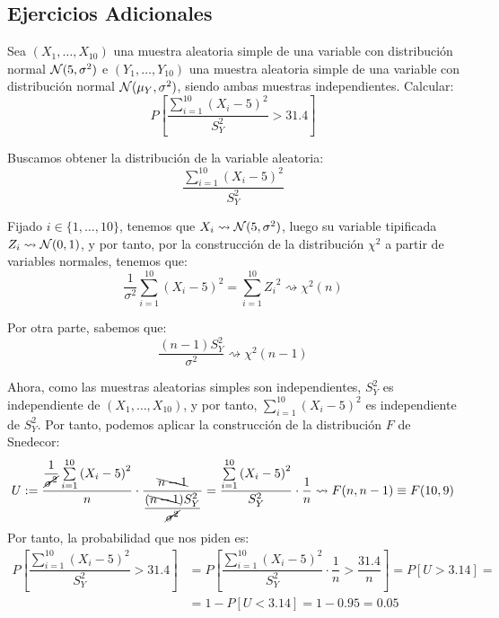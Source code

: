 \subsection*{Ejercicios Adicionales}
\begin{ejercicio}[Reto]
    Sea $(X_1, \ldots, X_{10})$ una muestra aleatoria simple de una variable con distribución normal $\mathcal{N}(5, \sigma^2)$ e $(Y_1, \ldots, Y_{10})$ una muestra aleatoria simple de una variable con distribución normal $\mathcal{N}(\mu_Y, \sigma^2)$, siendo ambas muestras independientes. Calcular:
    \begin{equation*}
        P\left[\dfrac{\sum\limits_{i=1}^{10}{(X_i-5)}^{2}}{S_Y^2} > 31.4\right]
    \end{equation*}
    
    Buscamos obtener la distribución de la variable aleatoria:
    \begin{equation*}
        \dfrac{\sum\limits_{i=1}^{10}{(X_i-5)}^{2}}{S_Y^2}
    \end{equation*}

    Fijado $i\in \{1, \ldots, 10\}$, tenemos que $X_i\rightsquigarrow\mathcal{N}(5, \sigma^2)$, luego su variable tipificada $Z_i \rightsquigarrow\mathcal{N}(0,1)$, y por tanto, por la construcción de la distribución $\chi^2$ a partir de variables normales, tenemos que:
    \begin{equation*}
        \dfrac{1}{\sigma^2}\sum\limits_{i=1}^{10}{(X_i-5)}^{2} = \sum\limits_{i=1}^{10}{Z_i}^{2} \rightsquigarrow \chi^2(n)
    \end{equation*}

    Por otra parte, sabemos que:
    \begin{equation*}
        \dfrac{(n-1)S_Y^2}{\sigma^2} \rightsquigarrow\chi^2(n-1) 
    \end{equation*}

    Ahora, como las muestras aleatorias simples son independientes, $S_Y^2$ es independiente de $(X_1, \ldots, X_{10})$, y por tanto, $\sum\limits_{i=1}^{10}{(X_i-5)}^{2}$ es independiente de $S_Y^2$. Por tanto, podemos aplicar la construcción de la distribución $F$ de Snedecor:
    \begin{equation*}
        U:=\dfrac{\dfrac{1}{\cancel{\sigma^2}}\sum\limits_{i=1}^{10}{(X_i-5)}^{2}}{n}\cdot \dfrac{\bcancel{n-1}}{\dfrac{(\bcancel{n-1})S_Y^2}{\cancel{\sigma^2}}} = \dfrac{\sum\limits_{i=1}^{10}{(X_i-5)}^{2}}{S_Y^2}\cdot\dfrac{1}{n} \rightsquigarrow F(n, n-1)\equiv F(10, 9)
    \end{equation*}
    Por tanto, la probabilidad que nos piden es:
    \begin{align*}
        P\left[\dfrac{\sum\limits_{i=1}^{10}{(X_i-5)}^{2}}{S_Y^2} > 31.4\right] &= P\left[\dfrac{\sum\limits_{i=1}^{10}{(X_i-5)}^{2}}{S_Y^2}\cdot\dfrac{1}{n} > \dfrac{31.4}{n}\right] = P\left[U > 3.14\right] =\\&= 1-P[U<3.14] = 1-0.95 = 0.05
    \end{align*}
\end{ejercicio}



